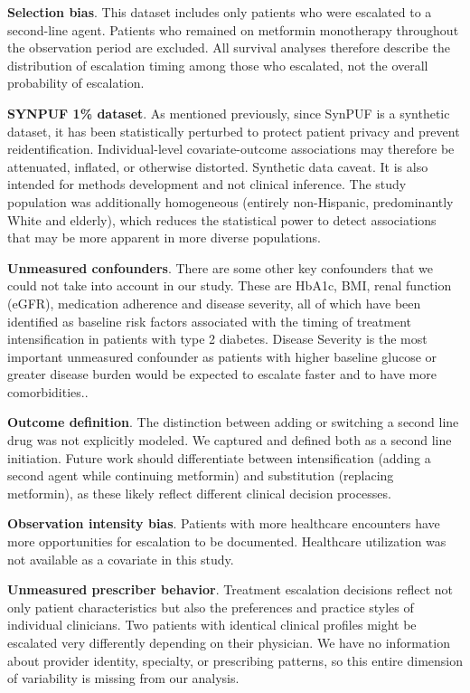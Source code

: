 \documentclass[twoside,11pt]{article}
\begin{document}
\textbf{Selection bias}. This dataset includes only patients who were escalated to a second-line agent. Patients who remained on metformin monotherapy throughout the observation period are excluded. All survival analyses therefore describe the distribution of escalation timing among those who escalated, not the overall probability of escalation.

\textbf{SYNPUF 1\% dataset}.  As mentioned previously, since SynPUF is a synthetic dataset, it has been statistically perturbed to protect patient privacy and prevent reidentification. Individual-level covariate-outcome associations may therefore be attenuated, inflated, or otherwise distorted. Synthetic data caveat. It is also intended for methods development and not clinical inference. The study population was additionally homogeneous (entirely non-Hispanic, predominantly White and elderly), which reduces the statistical power to detect associations that may be more apparent in more diverse populations.

\textbf{Unmeasured confounders}. There are some other key confounders that we could not take into account in our study. These are HbA1c, BMI, renal function (eGFR), medication adherence and disease severity, all of which have been identified as baseline risk factors associated with the timing of treatment intensification in patients with type 2 diabetes. Disease Severity is the most important unmeasured confounder as patients with higher baseline glucose or greater disease burden would be expected to escalate faster and to have more comorbidities..

\textbf{Outcome definition}. The distinction between adding or switching a second line drug was not explicitly modeled. We captured and defined both as a second line initiation. Future work should differentiate between intensification (adding a second agent while continuing metformin) and substitution (replacing metformin), as these likely reflect different clinical decision processes.

\textbf{Observation intensity bias}. Patients with more healthcare encounters have more opportunities for escalation to be documented. Healthcare utilization was not available as a covariate in this study.

\textbf{Unmeasured prescriber behavior}. Treatment escalation decisions reflect not only patient characteristics but also the preferences and practice styles of individual clinicians. Two patients with identical clinical profiles might be escalated very differently depending on their physician. We have no information about provider identity, specialty, or prescribing patterns, so this entire dimension of variability is missing from our analysis.
\end{document}
